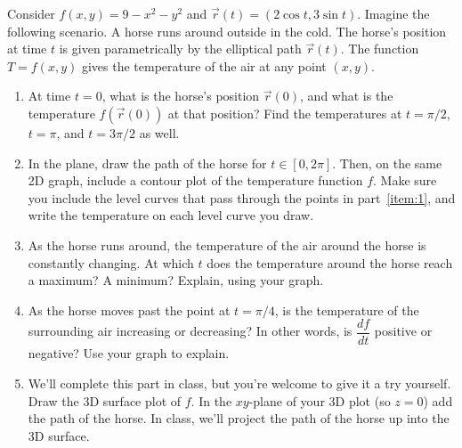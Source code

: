 \begin{problem}\label{horse track chain rule introduction}
 Consider $f(x,y)=9-x^2-y^2$ and $\vec r(t)=(2\cos t, 3\sin t)$. Imagine the following scenario.  A horse runs around outside in the cold. The horse's position at time $t$ is given parametrically by the elliptical path $\vec r(t)$. The function $T=f(x,y)$ gives the temperature of the air at any point $(x,y)$.  
\begin{enumerate}
 \item\label{item:1} At time $t=0$, what is the horse's position $\vec r(0)$, and what is the temperature $f(\vec r(0))$ at that position? Find the temperatures at $t=\pi/2$, $t=\pi$, and $t=3\pi/2$ as well. 
 \item {}%
In the plane, draw the path of the horse for $t\in [0,2\pi]$. Then, on the same 2D graph, include a contour plot of the temperature function $f$. Make sure you include the level curves that pass through the points in part~\ref{item:1}, and write the temperature on each level curve you draw. 
 \item{}%
 As the horse runs around, the temperature of the air around the horse is constantly changing. 
At which $t$ does the temperature around the horse reach a maximum?  A minimum?  Explain, using your graph. 
 \item\label{item:2} As the horse moves past the point at $t=\pi/4$, is the temperature of the surrounding air increasing or decreasing? In other words, is $\dfrac{df}{dt}$ positive or negative? Use your graph to explain.
 \item We'll complete this part in class, but you're welcome to give it a try yourself. %
Draw the 3D surface plot of $f$. In the $xy$-plane of your 3D plot (so $z=0$) add the path of the horse. In class, we'll project the path of the horse up into the 3D surface. 
\end{enumerate}
\end{problem}

